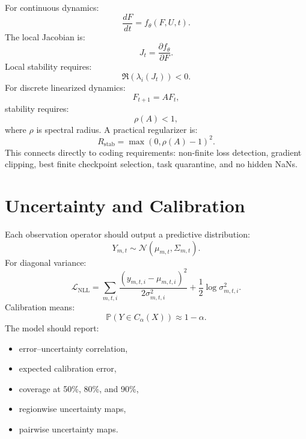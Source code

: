 \documentclass[11pt]{article}
\newcommand{\N}{\mathcal{N}}
\newcommand{\loss}{\mathcal{L}}
\begin{document}
For continuous dynamics:
\begin{equation}
\frac{dF}{dt}=f_\theta(F,U,t).
\end{equation}
The local Jacobian is:
\begin{equation}
J_t=\frac{\partial f_\theta}{\partial F}.
\end{equation}
Local stability requires:
\begin{equation}
\Re(\lambda_i(J_t))<0.
\end{equation}
For discrete linearized dynamics:
\begin{equation}
F_{t+1}=AF_t,
\end{equation}
stability requires:
\begin{equation}
\rho(A)<1,
\end{equation}
where $\rho$ is spectral radius. A practical regularizer is:
\begin{equation}
R_{\mathrm{stab}}=\max(0,\rho(A)-1)^2.
\end{equation}
This connects directly to coding requirements: non-finite loss detection, gradient clipping, best finite checkpoint selection, task quarantine, and no hidden NaNs.

\section{Uncertainty and Calibration}

Each observation operator should output a predictive distribution:
\begin{equation}
Y_{m,t}\sim\N(\mu_{m,t},\Sigma_{m,t}).
\end{equation}
For diagonal variance:
\begin{equation}
\loss_{\mathrm{NLL}}=\sum_{m,t,i}\frac{(y_{m,t,i}-\mu_{m,t,i})^2}{2\sigma_{m,t,i}^2}+\frac{1}{2}\log\sigma_{m,t,i}^2.
\end{equation}
Calibration means:
\begin{equation}
\mathbb{P}\left(Y\in C_\alpha(X)\right)\approx 1-\alpha.
\end{equation}
The model should report:
\begin{itemize}
\item error--uncertainty correlation,
\item expected calibration error,
\item coverage at 50\%, 80\%, and 90\%,
\item regionwise uncertainty maps,
\item pairwise uncertainty maps.
\end{itemize}
\end{document}
